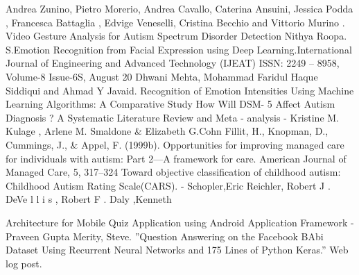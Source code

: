 


\clearpage
{}
\begin{thebibliography}{99}

Andrea Zunino, Pietro Morerio, Andrea Cavallo, Caterina Ansuini, Jessica Podda , Francesca Battaglia , Edvige Veneselli, Cristina Becchio and Vittorio Murino
. Video Gesture Analysis
for Autism Spectrum Disorder Detection 
Nithya Roopa. S.Emotion Recognition from Facial Expression using Deep Learning.International Journal of Engineering and Advanced Technology (IJEAT)
ISSN: 2249 – 8958, Volume-8 Issue-6S, August 20
Dhwani Mehta, Mohammad Faridul Haque Siddiqui and Ahmad Y Javaid.
Recognition of Emotion Intensities Using Machine Learning Algorithms: A Comparative Study
 How Will DSM- 5 Affect Autism Diagnosis ? A Systematic Literature Review and Meta - analysis - Kristine M. Kulage , Arlene M. Smaldone & Elizabeth G.Cohn
Fillit, H., Knopman, D., Cummings, J., & Appel, F. (1999b). Opportunities
for improving managed care for individuals with autism: Part 2—A
framework for care. American Journal of Managed Care, 5, 317–324
Toward objective classification of childhood autism: Childhood Autism Rating Scale(CARS). - Schopler,Eric Reichler, Robert J . DeVe l l i s , Robert F . Daly ,Kenneth

Architecture for Mobile Quiz Application using Android Application Framework - Praveen Gupta 
Merity, Steve. ”Question Answering on the Facebook BAbi Dataset Using Recurrent Neural
Networks and 175 Lines of Python Keras.” Web log post.


\end{thebibliography}






